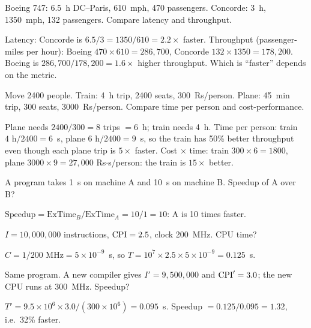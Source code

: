 \documentclass[11pt]{article}
\begin{document}
\begin{exercise}
Boeing 747: 6.5~h DC--Paris, 610~mph, 470 passengers. Concorde: 3~h,
1350~mph, 132 passengers. Compare latency and throughput.
\end{exercise}
\begin{solution}
Latency: Concorde is $6.5/3 = 1350/610 = 2.2\times$ faster.
Throughput (passenger-miles per hour): Boeing $470\times610=286{,}700$,
Concorde $132\times1350=178{,}200$. Boeing is $286{,}700/178{,}200 =
1.6\times$ higher throughput. Which is ``faster'' depends on the metric.
\end{solution}

\begin{exercise}
Move 2400 people. Train: 4~h trip, 2400 seats, 300~Rs/person. Plane: 45~min
trip, 300 seats, 3000~Rs/person. Compare time per person and cost-performance.
\end{exercise}
\begin{solution}
Plane needs $2400/300=8$ trips $=6$~h; train needs 4~h. Time per person:
train $4\text{ h}/2400 = 6$~s, plane $6\text{ h}/2400=9$~s, so the train
has 50\% better throughput even though each plane trip is $5\times$
faster. Cost $\times$ time: train $300\times6=1800$, plane
$3000\times9=27{,}000$ Rs$\cdot$s/person: the train is $15\times$ better.
\end{solution}

\begin{exercise}[Speedup]
A program takes 1~s on machine A and 10~s on machine B. Speedup of A over B?
\end{exercise}
\begin{solution}
$\text{Speedup} = \text{ExTime}_B/\text{ExTime}_A = 10/1 = 10$: A is
10 times faster.
\end{solution}

\begin{exercise}
$I = 10{,}000{,}000$ instructions, $\mathrm{CPI}=2.5$, clock 200~MHz. CPU time?
\end{exercise}
\begin{solution}
$C = 1/200\text{ MHz} = 5\times10^{-9}$~s, so
$T = 10^7\times2.5\times5\times10^{-9} = 0.125$~s.
\end{solution}

\begin{exercise}
Same program. A new compiler gives $I'=9{,}500{,}000$ and $\mathrm{CPI}'=3.0$; the
new CPU runs at 300~MHz. Speedup?
\end{exercise}
\begin{solution}
$T' = 9.5\times10^6\times3.0/(300\times10^6) = 0.095$~s.
Speedup $=0.125/0.095 = 1.32$, i.e.\ 32\% faster.
\end{solution}
\end{document}

